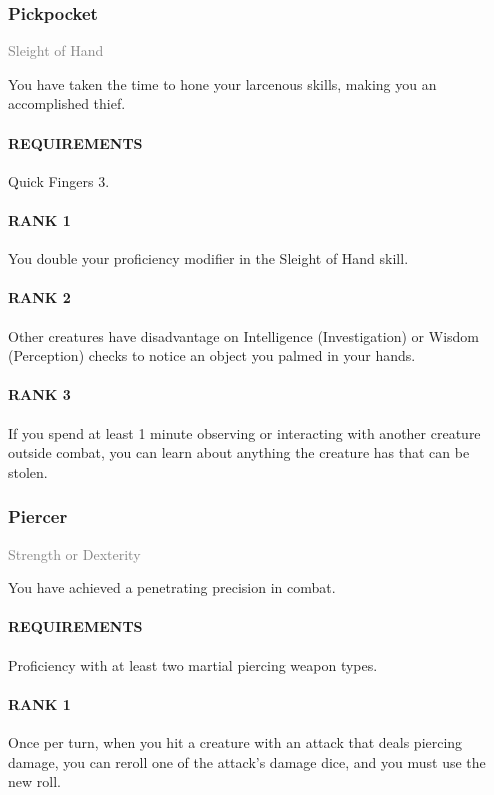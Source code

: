 \subsubsection{Pickpocket} \label{feat::pickpocket}
\small{\textcolor{gray}{Sleight of Hand}}

\normalsize
You have taken the time to hone your larcenous skills, making you an accomplished thief.
\paragraph{REQUIREMENTS} Quick Fingers 3.
\paragraph{RANK 1} You double your proficiency modifier in the Sleight of Hand skill.
\paragraph{RANK 2} Other creatures have disadvantage on Intelligence (Investigation) or Wisdom (Perception) checks to notice an object you palmed in your hands.
\paragraph{RANK 3} If you spend at least 1 minute observing or interacting with another creature outside combat, you can learn about anything the creature has that can be stolen.

\subsubsection{Piercer} \label{feat::piercer}
\small{\textcolor{gray}{Strength or Dexterity}}

\normalsize
You have achieved a penetrating precision in combat.
\paragraph{REQUIREMENTS} Proficiency with at least two martial piercing weapon types.
\paragraph{RANK 1} Once per turn, when you hit a creature with an attack that deals piercing damage, you can reroll one of the attack's damage dice, and you must use the new roll.
